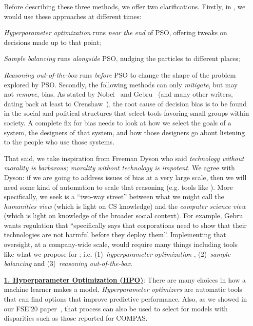  Before describing these three methods, we offer two clarifications.  
 Firstly, in , we would use these approaches at   different times:
 \be
 \item {\em Hyperparameter optimization} runs {\em near the end} of PSO, offering tweaks on   decisions made up to that point;
 \item {\em Sample balancing} runs {\em alongside} PSO, 
 nudging the particles to different places;
 \item  {\em Reasoning out-of-the-box}   runs {\em before} PSO to  change the shape
 of the problem explored by PSO.
 \ee
Secondly,    the following methods can only {\em mitigate}, but may not  {\em remove}, bias.
As stated by  Nobel~\cite{noble2018algorithms} and   Gebru~\cite{gebru21} 
(and many other writers, dating back at least to Crenshaw~\cite{crenshaw2017race}), the root cause of decision
bias is to be found in the social and political structures that select tools favoring small groups within
society. A complete fix for bias   needs to look
at how we select the goals of a system, the designers of that system, and how those designers   go about listening to the people
who use those systems. 

That said, we take   inspiration from Freeman Dyson who   said
{\em technology without morality is barbarous; morality without technology is impotent}. We agree with Dyson: 
if 
we are going to address issues of bias at a very large scale, then we will need some kind of automation to scale that reasoning (e.g. tools like ). More specifically, we seek is a ``two-way street'' between what we might call the {\em humanities view} (which is light on CS knowledge) and the {\em computer science view} (which is light on knowledge of the broader social context). For example, 
Gebru~\cite{adams21a}
wants regulation that ``specifically says that corporations need to show that their technologies are not harmful before they deploy them''.
Implementing that   oversight, at a company-wide scale, would
require many things including tools like what we propose for ; i.e.
(1)~{\em hyperparameter optimization} ,  (2)~{\em sample balancing} 
and (3)~{\em reasoning out-of-the-box}.
  

\noindent\underline{\bf 1. Hyperparameter Optimization (HPO)}: 
 There are many choices in how a machine learner makes a model.
 {\em Hyperparameter optimizers} are automatic tools that can    find options that 
 improve predictive
 performance. Also, as we showed in our FSE'20 paper~\cite{Chakraborty_2020},
 that     process can also be used to select for   models with
 disparities such as those reported for COMPAS.

